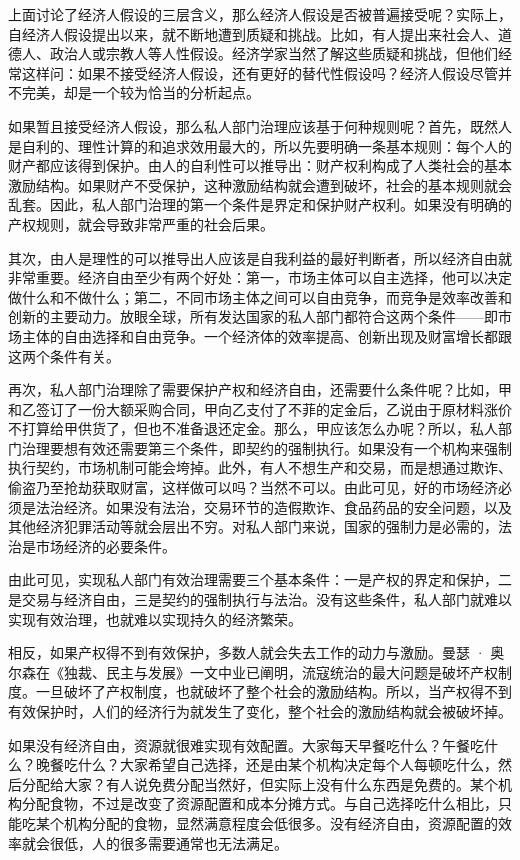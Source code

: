 上面讨论了经济人假设的三层含义，那么经济人假设是否被普遍接受呢？实际上，自经济人假设提出以来，就不断地遭到质疑和挑战。比如，有人提出来社会人、道德人、政治人或宗教人等人性假设。经济学家当然了解这些质疑和挑战，但他们经常这样问：如果不接受经济人假设，还有更好的替代性假设吗？经济人假设尽管并不完美，却是一个较为恰当的分析起点。


如果暂且接受经济人假设，那么私人部门治理应该基于何种规则呢？首先，既然人是自利的、理性计算的和追求效用最大的，所以先要明确一条基本规则：每个人的财产都应该得到保护。由人的自利性可以推导出：财产权利构成了人类社会的基本激励结构。如果财产不受保护，这种激励结构就会遭到破坏，社会的基本规则就会乱套。因此，私人部门治理的第一个条件是界定和保护财产权利。如果没有明确的产权规则，就会导致非常严重的社会后果。

其次，由人是理性的可以推导出人应该是自我利益的最好判断者，所以经济自由就非常重要。经济自由至少有两个好处：第一，市场主体可以自主选择，他可以决定做什么和不做什么；第二，不同市场主体之间可以自由竞争，而竞争是效率改善和创新的主要动力。放眼全球，所有发达国家的私人部门都符合这两个条件——即市场主体的自由选择和自由竞争。一个经济体的效率提高、创新出现及财富增长都跟这两个条件有关。

再次，私人部门治理除了需要保护产权和经济自由，还需要什么条件呢？比如，甲和乙签订了一份大额采购合同，甲向乙支付了不菲的定金后，乙说由于原材料涨价不打算给甲供货了，但也不准备退还定金。那么，甲应该怎么办呢？所以，私人部门治理要想有效还需要第三个条件，即契约的强制执行。如果没有一个机构来强制执行契约，市场机制可能会垮掉。此外，有人不想生产和交易，而是想通过欺诈、偷盗乃至抢劫获取财富，这样做可以吗？当然不可以。由此可见，好的市场经济必须是法治经济。如果没有法治，交易环节的造假欺诈、食品药品的安全问题，以及其他经济犯罪活动等就会层出不穷。对私人部门来说，国家的强制力是必需的，法治是市场经济的必要条件。

由此可见，实现私人部门有效治理需要三个基本条件：一是产权的界定和保护，二是交易与经济自由，三是契约的强制执行与法治。没有这些条件，私人部门就难以实现有效治理，也就难以实现持久的经济繁荣。

相反，如果产权得不到有效保护，多数人就会失去工作的动力与激励。曼瑟 · 奥尔森在《独裁、民主与发展》一文中业已阐明，流寇统治的最大问题是破坏产权制度。一旦破坏了产权制度，也就破坏了整个社会的激励结构。所以，当产权得不到有效保护时，人们的经济行为就发生了变化，整个社会的激励结构就会被破坏掉。

如果没有经济自由，资源就很难实现有效配置。大家每天早餐吃什么？午餐吃什么？晚餐吃什么？大家希望自己选择，还是由某个机构决定每个人每顿吃什么，然后分配给大家？有人说免费分配当然好，但实际上没有什么东西是免费的。某个机构分配食物，不过是改变了资源配置和成本分摊方式。与自己选择吃什么相比，只能吃某个机构分配的食物，显然满意程度会低很多。没有经济自由，资源配置的效率就会很低，人的很多需要通常也无法满足。

